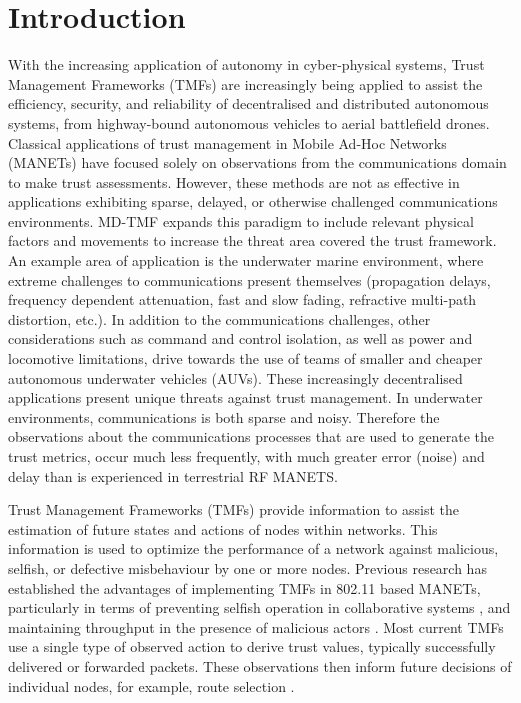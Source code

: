 \documentclass{aamas2016}
\begin{document}




\section{Introduction}
With the increasing application of autonomy in cyber-physical systems, Trust Management Frameworks (TMFs) are increasingly being applied to assist the efficiency, security, and reliability of decentralised and distributed autonomous systems, from highway-bound autonomous vehicles to aerial battlefield drones. 
Classical applications of trust management in Mobile Ad-Hoc Networks (MANETs) have focused solely on observations from the communications domain to make trust assessments. 
However, these methods are not as effective in applications exhibiting sparse, delayed, or otherwise challenged communications environments\cite{Pavan2015}. MD-TMF expands this paradigm to include relevant physical factors and movements to increase the threat area covered the trust framework. An example area of application is the underwater marine environment, where extreme challenges to communications present themselves (propagation delays, frequency dependent attenuation, fast and slow fading, refractive multi-path distortion, etc.).
In addition to the communications challenges, other considerations such as command and control isolation, as well as power and locomotive limitations, drive towards the use of teams of smaller and cheaper autonomous underwater vehicles (AUVs). These increasingly decentralised applications present unique threats against trust management. In underwater environments, communications is both sparse and noisy.
Therefore the observations about the communications processes that are used to generate the trust metrics, occur much less frequently, with much greater error (noise) and delay than is experienced in terrestrial RF MANETS.

Trust Management Frameworks (TMFs) provide information to assist the estimation of future states and actions of nodes within networks. This information is used to optimize the performance of a network against malicious, selfish, or defective misbehaviour by one or more nodes. Previous research has established the advantages of implementing TMFs in 802.11 based MANETs, particularly in terms of preventing selfish operation in collaborative systems \cite{Li2007}, and maintaining throughput in the presence of malicious actors \cite{Buchegger2002}. Most current TMFs use a single type of observed action to derive trust values, typically successfully delivered or forwarded packets. These observations then inform future decisions of individual nodes, for example, route selection \cite{Li2008}.
\end{document}
